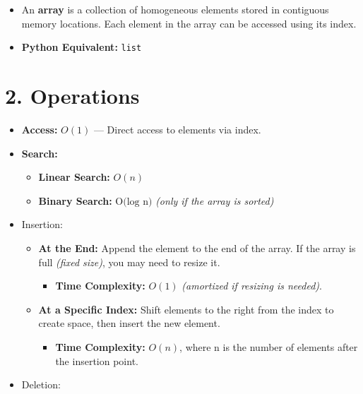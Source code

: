 \documentclass[
  letterpaper,
  DIV=11,
  numbers=noendperiod]{scrreprt}
\providecommand{\tightlist}{%
  \setlength{\itemsep}{0pt}\setlength{\parskip}{0pt}}
\begin{document}
\begin{itemize}
\tightlist
\item
  An \textbf{array} is a collection of homogeneous elements stored in
  contiguous memory locations. Each element in the array can be accessed
  using its index.
\item
  \textbf{Python Equivalent:} \texttt{list}
\end{itemize}

\section{2. Operations}

\begin{itemize}
\item
  \textbf{Access:} \(O(1)\) --- Direct access to elements via index.
\item
  \textbf{Search:}

  \begin{itemize}
  \tightlist
  \item
    \textbf{Linear Search:} \(O(n)\)
  \item
    \textbf{Binary Search:} \(\text{O(log⁡ n)}\) \emph{(only if the array
    is sorted)}
  \end{itemize}
\item
  Insertion:

  \begin{itemize}
  \tightlist
  \item
    \textbf{At the End:} Append the element to the end of the array. If
    the array is full \emph{(fixed size)}, you may need to resize it.

    \begin{itemize}
    \tightlist
    \item
      \textbf{Time Complexity:} \(O(1)\) \emph{(amortized if resizing is
      needed)}.
    \end{itemize}
  \item
    \textbf{At a Specific Index:} Shift elements to the right from the
    index to create space, then insert the new element.

    \begin{itemize}
    \tightlist
    \item
      \textbf{Time Complexity:} \(O(n)\), where n is the number of
      elements after the insertion point.
    \end{itemize}
  \end{itemize}
\item
  Deletion:


\end{itemize}
\end{document}

